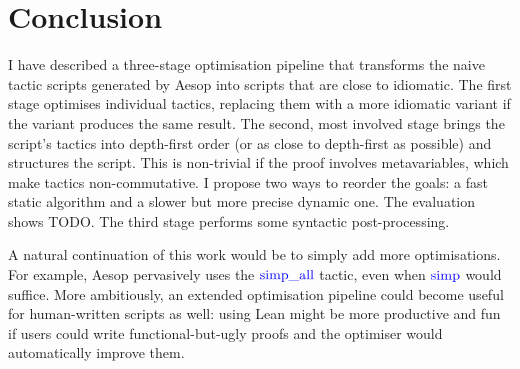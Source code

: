 \documentclass[sigplan,10pt,anonymous,review]{acmart}
\newcommand{\tac}[1]{\ensuremath{\mathrm{\mathcolor{blue}{#1}}}}
\begin{document}
\section{Conclusion}%
\label{sec:concl}

I have described a three-stage optimisation pipeline that transforms the naive tactic scripts generated by Aesop into scripts that are close to idiomatic.
The first stage optimises individual tactics, replacing them with a more idiomatic variant if the variant produces the same result.
The second, most involved stage brings the script's tactics into depth-first order (or as close to depth-first as possible) and structures the script.
This is non-trivial if the proof involves metavariables, which make tactics non-commutative.
I propose two ways to reorder the goals: a fast static algorithm and a slower but more precise dynamic one.
The evaluation shows TODO.
The third stage performs some syntactic post-processing.

A natural continuation of this work would be to simply add more optimisations.
For example, Aesop pervasively uses the \tac{simp\_all} tactic, even when \tac{simp} would suffice.
More ambitiously, an extended optimisation pipeline could become useful for human-written scripts as well:
using Lean might be more productive and fun if users could write functional-but-ugly proofs and the optimiser would automatically improve them.



\end{document}
